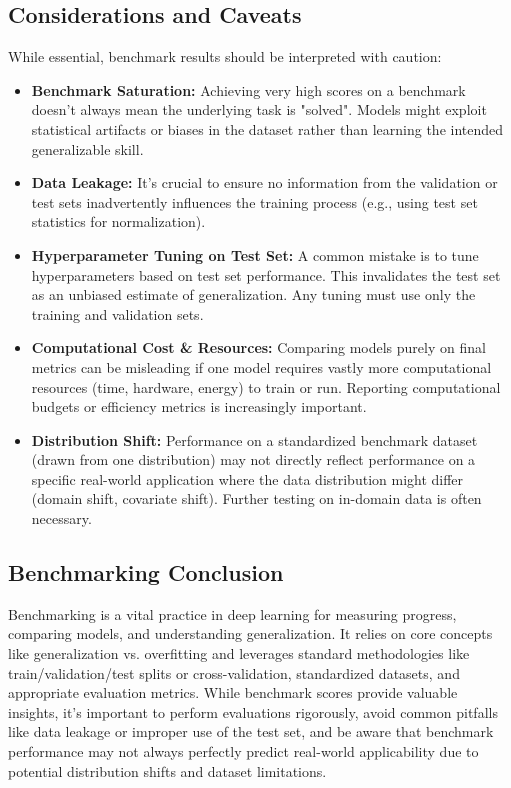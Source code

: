 \documentclass{article}
\begin{document}
\subsection{Considerations and Caveats}

While essential, benchmark results should be interpreted with caution:
\begin{itemize}
    \item \textbf{Benchmark Saturation:} Achieving very high scores on a benchmark doesn't always mean the underlying task is "solved". Models might exploit statistical artifacts or biases in the dataset rather than learning the intended generalizable skill.
    \item \textbf{Data Leakage:} It's crucial to ensure no information from the validation or test sets inadvertently influences the training process (e.g., using test set statistics for normalization).
    \item \textbf{Hyperparameter Tuning on Test Set:} A common mistake is to tune hyperparameters based on test set performance. This invalidates the test set as an unbiased estimate of generalization. Any tuning must use only the training and validation sets.
    \item \textbf{Computational Cost \& Resources:} Comparing models purely on final metrics can be misleading if one model requires vastly more computational resources (time, hardware, energy) to train or run. Reporting computational budgets or efficiency metrics is increasingly important.
    \item \textbf{Distribution Shift:} Performance on a standardized benchmark dataset (drawn from one distribution) may not directly reflect performance on a specific real-world application where the data distribution might differ (domain shift, covariate shift). Further testing on in-domain data is often necessary.
\end{itemize}

\subsection{Benchmarking Conclusion}

Benchmarking is a vital practice in deep learning for measuring progress, comparing models, and understanding generalization. It relies on core concepts like generalization vs. overfitting and leverages standard methodologies like train/validation/test splits or cross-validation, standardized datasets, and appropriate evaluation metrics. While benchmark scores provide valuable insights, it's important to perform evaluations rigorously, avoid common pitfalls like data leakage or improper use of the test set, and be aware that benchmark performance may not always perfectly predict real-world applicability due to potential distribution shifts and dataset limitations.
\end{document}
